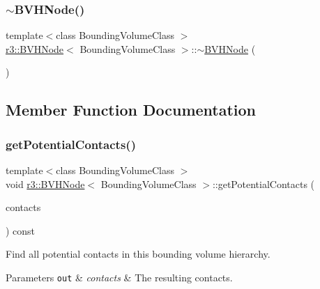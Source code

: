\subsubsection{\texorpdfstring{$\sim$\+B\+V\+H\+Node()}{~BVHNode()}}
{\footnotesize\ttfamily template$<$class Bounding\+Volume\+Class $>$ \\
\mbox{\hyperlink{classr3_1_1_b_v_h_node}{r3\+::\+B\+V\+H\+Node}}$<$ Bounding\+Volume\+Class $>$\+::$\sim$\mbox{\hyperlink{classr3_1_1_b_v_h_node}{B\+V\+H\+Node}} (\begin{DoxyParamCaption}{ }\end{DoxyParamCaption})}



\subsection{Member Function Documentation}
\mbox{\label{classr3_1_1_b_v_h_node_a922773e61c14d365f2b9c9740d565783}} 
\subsubsection{\texorpdfstring{get\+Potential\+Contacts()}{getPotentialContacts()}}
{\footnotesize\ttfamily template$<$class Bounding\+Volume\+Class $>$ \\
void \mbox{\hyperlink{classr3_1_1_b_v_h_node}{r3\+::\+B\+V\+H\+Node}}$<$ Bounding\+Volume\+Class $>$\+::get\+Potential\+Contacts (\begin{DoxyParamCaption}\item[{\mbox{\hyperlink{classr3_1_1_fixed_size_container}{Fixed\+Size\+Container}}$<$ \mbox{\hyperlink{classr3_1_1_collision_pair}{Collision\+Pair}} $>$ \&}]{contacts }\end{DoxyParamCaption}) const}



Find all potential contacts in this bounding volume hierarchy. 


\begin{DoxyParams}[1]{Parameters}
\mbox{\tt out}  & {\em contacts} & The resulting contacts. \\
\hline
\end{DoxyParams}
\mbox{\label{classr3_1_1_b_v_h_node_a00031bc5ca7a6971a396cad6ff3fe490}} 
